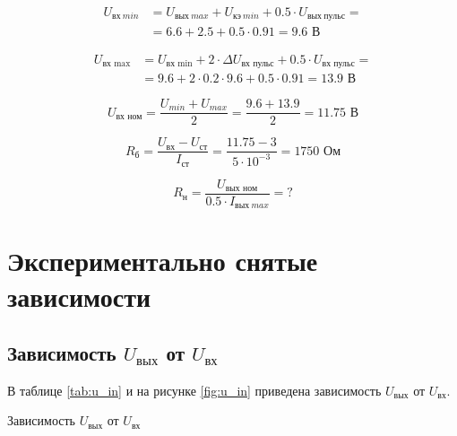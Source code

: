 \begin{displaymath}
\begin{aligned}
	U_{\text{вх}\ min} &= U_{\text{вых}\ max} + U_{\text{кэ}\ min} + 0.5 \cdot U_{\text{вых}\ пульс} = \\ &= 6.6 + 2.5 + 0.5 \cdot 0.91 = 9.6 \text{ В}
\end{aligned}
\end{displaymath}

\begin{displaymath}
\begin{aligned}
	U_\text{вх\ max} &= U_\text{вх\ min} + 2 \cdot \Delta U_\text{вх\ пульс} + 0.5 \cdot U_\text{вх\ пульс} = \\ &= 9.6 + 2 \cdot 0.2 \cdot 9.6 + 0.5 \cdot 0.91 = 13.9 \text{ В}
\end{aligned}
\end{displaymath}

\begin{displaymath}
	U_\text{вх\ ном} = \frac{U_{min} + U_{max}}{2} = \frac{9.6 + 13.9}{2} = 11.75 \text{ В}
\end{displaymath}

\begin{displaymath}
	R_\text{б} = \frac{U_\text{вх} - U_\text{ст}}{I_\text{ст}} = \frac{11.75 - 3}{5 \cdot 10^{-3}} = 1750 \text{ Ом}
\end{displaymath}

\begin{displaymath}
	R_\text{н} = \frac{U_\text{вых ном}}{0.5 \cdot I_{\text{вых}\ max}} = ?
\end{displaymath}

\section{Экспериментально снятые зависимости}

\subsection{Зависимость $U_\text{вых}$ от $U_\text{вх}$}

В таблице \ref{tab:u_in} и на рисунке \ref{fig:u_in} приведена зависимость $U_\text{вых}$ от $U_\text{вх}$.

\begin{table}[H]
\begin{center}
	\caption{Зависимость $U_\text{вых}$ от $U_\text{вх}$}
	\label{tab:u_in}
	\def\tabcolsep{40pt}
\end{center}
\end{table}


